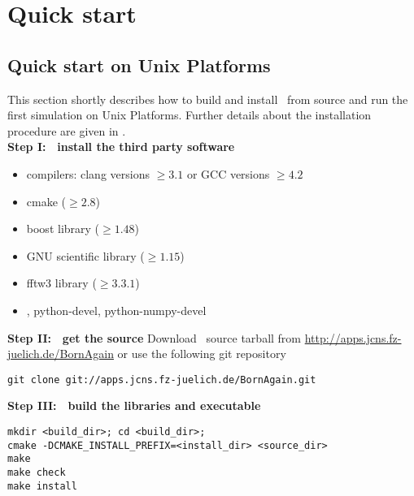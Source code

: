 \newpage
\chapter{Quick start} 

\section{Quick start on Unix Platforms}

This section shortly describes how to build and install \BornAgain\ 
from source and run the first simulation on Unix Platforms. 
Further details about the installation procedure are given in . \\

\noindent
{\bf Step I: $~$ install the third party software}
\begin{itemize}
\item compilers: clang  versions $\geq 3.1$ or GCC versions $\geq 4.2$
\item cmake ($\geq 2.8$)
\item boost library ($\geq 1.48$)
\item GNU scientific library ($\geq 1.15$)
\item fftw3 library ($\geq 3.3.1$)
\item {}, python-devel, python-numpy-devel
\end{itemize}
\vspace*{2mm}


\noindent
{\bf Step II: $~$ get the source} \newline
Download \BornAgain\ source tarball from \url{http://apps.jcns.fz-juelich.de/BornAgain}
or use the following git repository
\begin{lstlisting}[language=shell, style=commandline]
git clone git://apps.jcns.fz-juelich.de/BornAgain.git 
\end{lstlisting}

\vspace*{3mm}



\noindent
{\bf Step III: $~$ build the libraries and executable}
\begin{lstlisting}[language=shell, style=commandline]
mkdir <build_dir>; cd <build_dir>;
cmake -DCMAKE_INSTALL_PREFIX=<install_dir> <source_dir>
make
make check
make install
\end{lstlisting}
\vspace*{3mm}



